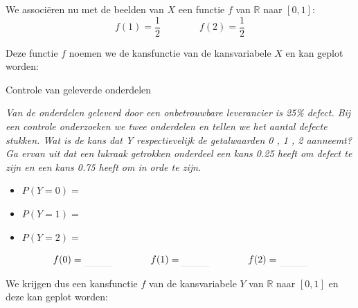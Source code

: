 \documentclass[12pt,twoside]{article}
\begin{document}
We associëren nu met de beelden van $X$ een functie $f$ van $\mathbb{R}$ naar $[0,1]$:
  $$f(1) = \dfrac{1}{2} \qquad\qquad f(2) = \dfrac{1}{2}$$

Deze functie $f$ noemen we de kansfunctie van de kansvariabele $X$ en kan geplot worden:
\begin{center}
\end{center}


\begin{oefening} Controle van geleverde onderdelen

{\em Van de onderdelen geleverd door een onbetrouwbare leverancier is 25\% defect. Bij een controle onderzoeken we twee onderdelen en tellen we het aantal defecte stukken. Wat is de kans dat Y respectievelijk de getalwaarden 0 , 1 , 2 aanneemt? Ga ervan uit dat een lukraak getrokken onderdeel een kans 0.25 heeft om defect te zijn en een kans 0.75 heeft om in orde te zijn.}\\

\begin{itemize}
  \itemsep1em
  \item $P(Y=0)=$\arulefill
  \item $P(Y=1)=$\arulefill
  \item $P(Y=2)=$\arulefill
\end{itemize}

$$f(0)=\arule{1cm} \qquad\qquad f(1)=\arule{1cm} \qquad\qquad f(2)=\arule{1cm}$$

We krijgen dus een kansfunctie $f$ van de kansvariabele $Y$ van $\mathbb{R}$ naar $[0,1]$ en deze kan geplot worden:

\begin{center}
\end{center}

\end{oefening}
\end{document}
